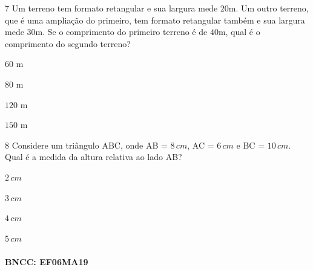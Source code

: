 \num{7}  Um terreno tem formato retangular e sua largura mede $20$m. Um outro
terreno, que é uma ampliação do primeiro, tem formato retangular também
e sua largura mede $30$m. Se o comprimento do primeiro terreno é de $40$m,
qual é o comprimento do segundo terreno?

\begin{escolha}
\item $60$ m
\item $80$ m
\item $120$ m
\item $150$ m
\end{escolha}



\num{8}  Considere um triângulo ABC, onde AB = $8\,cm$, AC = $6\,cm$ e BC = $10\,cm$.
Qual é a medida da altura relativa ao lado AB?

\begin{escolha}
\item $2\,cm$
\item $3\,cm$
\item $4\,cm$
\item $5\,cm$
\end{escolha}

\paragraph{BNCC: EF06MA19}

